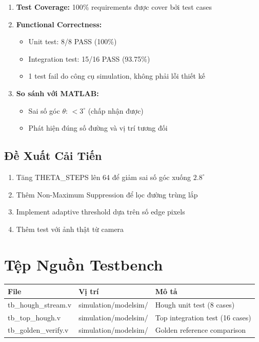 \documentclass[12pt,a4paper]{article}
\begin{document}
\begin{enumerate}
    \item \textbf{Test Coverage:} 100\% requirements được cover bởi test cases
    
    \item \textbf{Functional Correctness:}
    \begin{itemize}
        \item Unit test: 8/8 PASS (100\%)
        \item Integration test: 15/16 PASS (93.75\%)
        \item 1 test fail do công cụ simulation, không phải lỗi thiết kế
    \end{itemize}
    
    \item \textbf{So sánh với MATLAB:}
    \begin{itemize}
        \item Sai số góc $\theta$: $< 3^\circ$ (chấp nhận được)
        \item Phát hiện đúng số đường và vị trí tương đối
    \end{itemize}
\end{enumerate}

\subsection{Đề Xuất Cải Tiến}

\begin{enumerate}
    \item Tăng THETA\_STEPS lên 64 để giảm sai số góc xuống $2.8^\circ$
    \item Thêm Non-Maximum Suppression để lọc đường trùng lắp
    \item Implement adaptive threshold dựa trên số edge pixels
    \item Thêm test với ảnh thật từ camera
\end{enumerate}

\appendix
\section{Tệp Nguồn Testbench}

\begin{table}[H]
\centering
\begin{tabular}{|l|l|l|}
\hline
\textbf{File} & \textbf{Vị trí} & \textbf{Mô tả} \\
\hline
tb\_hough\_stream.v & simulation/modelsim/ & Hough unit test (8 cases) \\
\hline
tb\_top\_hough.v & simulation/modelsim/ & Top integration test (16 cases) \\
\hline
tb\_golden\_verify.v & simulation/modelsim/ & Golden reference comparison \\
\hline
\end{tabular}
\end{table}
\end{document}
